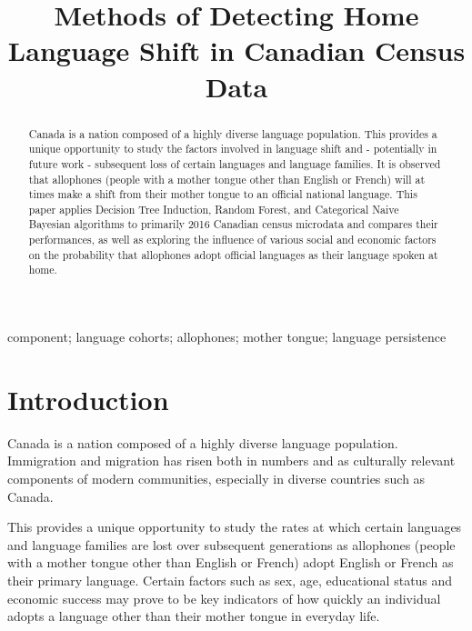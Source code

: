 \documentclass[10pt, conference, compsocconf]{IEEEtran}
\begin{document}
\title{Methods of Detecting Home Language Shift in Canadian Census Data}

\author{
}

\maketitle


\begin{abstract}
Canada is a nation composed of a highly diverse language population. This provides a unique opportunity to study the factors involved in language shift and - potentially in future work - subsequent loss of certain languages and language families. It is observed that allophones (people with a mother tongue other than English or French) will at times make a shift from their mother tongue to an official national language. This paper applies Decision Tree Induction, Random Forest, and Categorical Naive Bayesian algorithms to primarily 2016 Canadian census microdata and compares their performances, as well as exploring the influence of various social and economic factors on the probability that allophones adopt official languages as their language spoken at home.

\end{abstract}

\begin{IEEEkeywords}
component; language cohorts; allophones; mother tongue; language persistence

\end{IEEEkeywords}


\IEEEpeerreviewmaketitle



\section{Introduction}
Canada is a nation composed of a highly diverse language population. Immigration and migration has risen both in numbers and as culturally relevant components of modern communities, especially in diverse countries such as Canada.

This provides a unique opportunity to study the rates at which certain languages and language families are lost over subsequent generations as allophones (people with a mother tongue other than English or French) adopt English or French as their primary language. Certain factors such as sex, age, educational status and economic success may prove to be key indicators of how quickly an individual adopts a language other than their mother tongue in everyday life.
\end{document}
